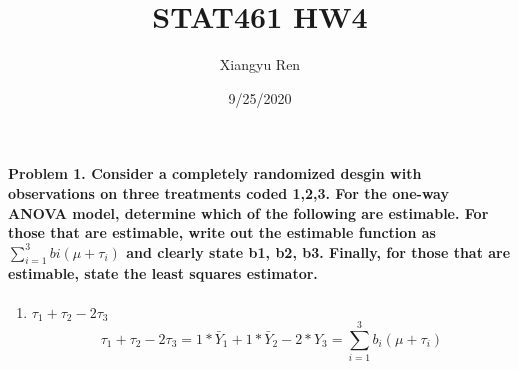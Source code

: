 \documentclass[
]{article}
\title{STAT461 HW4}
\author{Xiangyu Ren}
\date{9/25/2020}
\providecommand{\tightlist}{%
  \setlength{\itemsep}{0pt}\setlength{\parskip}{0pt}}
\begin{document}
\maketitle

\hypertarget{problem-1.-consider-a-completely-randomized-desgin-with-observations-on-three-treatments-coded-123.-for-the-one-way-anova-model-determine-which-of-the-following-are-estimable.-for-those-that-are-estimable-write-out-the-estimable-function-as-sum_i13-biux3bc-ux3c4_i-and-clearly-state-b1-b2-b3.-finally-for-those-that-are-estimable-state-the-least-squares-estimator.}{%
\paragraph{\texorpdfstring{Problem 1. Consider a completely randomized
desgin with observations on three treatments coded 1,2,3. For the
one-way ANOVA model, determine which of the following are estimable. For
those that are estimable, write out the estimable function as
\(\sum_{i=1}^3 bi(μ + τ_i)\) and clearly state b1, b2, b3. Finally, for
those that are estimable, state the least squares
estimator.}{Problem 1. Consider a completely randomized desgin with observations on three treatments coded 1,2,3. For the one-way ANOVA model, determine which of the following are estimable. For those that are estimable, write out the estimable function as \textbackslash sum\_\{i=1\}\^{}3 bi(μ + τ\_i) and clearly state b1, b2, b3. Finally, for those that are estimable, state the least squares estimator.}}\label{problem-1.-consider-a-completely-randomized-desgin-with-observations-on-three-treatments-coded-123.-for-the-one-way-anova-model-determine-which-of-the-following-are-estimable.-for-those-that-are-estimable-write-out-the-estimable-function-as-sum_i13-biux3bc-ux3c4_i-and-clearly-state-b1-b2-b3.-finally-for-those-that-are-estimable-state-the-least-squares-estimator.}}

\begin{enumerate}
\def\labelenumi{(\alph{enumi})}
\tightlist
\item
  \(τ_1+τ_2-2τ_3\)
  \[τ_1+τ_2-2τ_3 = 1*\bar Y_1+1*\bar Y_2-2*Y_3 = \sum_{i=1}^3 b_i(μ+τ_i)\]
\end{enumerate}
\end{document}
